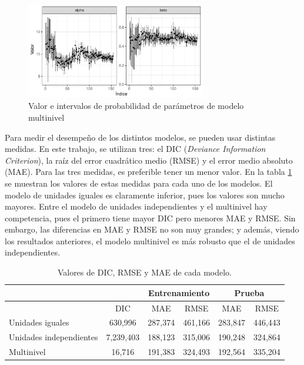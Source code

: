 \begin{figure}[H]
    \centering
    \includegraphics[width=0.7\textwidth]{images/three_levels_param_values.pdf}
    \caption{Valor e intervalos de probabilidad de parámetros de modelo multinivel}
    \label{fig:three_levels_param_values}
\end{figure}

Para medir el desempeño de los distintos modelos, se pueden usar distintas medidas. En este trabajo, se utilizan tres: el DIC (\textit{Deviance Information Criterion}), la raíz del error cuadrático medio (RMSE) y el error medio absoluto (MAE). Para las tres medidas, es preferible tener un menor valor. En la tabla \ref{tab:dic_rmse_mae} se muestran los valores de estas medidas para cada uno de los modelos. El modelo de unidades iguales es claramente inferior, pues los valores son mucho mayores. Entre el modelo de unidades independientes y el multinivel hay competencia, pues el primero tiene mayor DIC pero menores MAE y RMSE. Sin embargo, las diferencias en MAE y RMSE no son muy grandes; y además, viendo los resultados anteriores, el modelo multinivel es más robusto que el de unidades independientes.

\begin{table}[]
\centering
\caption{Valores de DIC, RMSE y MAE de cada modelo.}
\label{tab:dic_rmse_mae}
\begin{tabular}{|l|c|c|c|c|c|}
\hline
                        &           & \multicolumn{2}{c|}{Entrenamiento} & \multicolumn{2}{c|}{Prueba} \\ \hline
                        & DIC       & MAE              & RMSE            & MAE          & RMSE         \\ \hline
Unidades iguales        & 630,996   & 287,374          & 461,166         & 283,847      & 446,443      \\ \hline
Unidades independientes & 7,239,403 & 188,123          & 315,006         & 190,248      & 324,864      \\ \hline
Multinivel              & 16,716    & 191,383          & 324,493         & 192,564      & 335,204      \\ \hline
\end{tabular}
\end{table}


